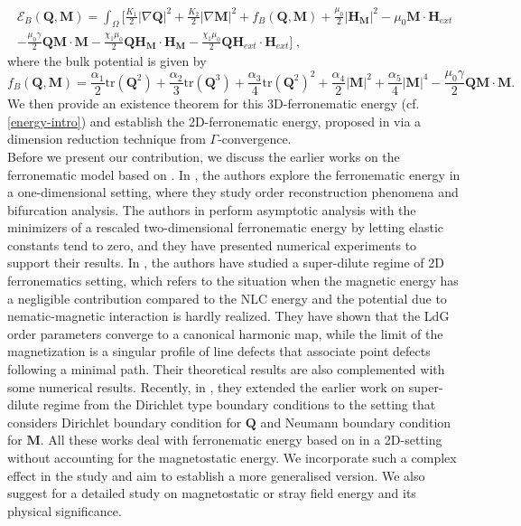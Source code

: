 \documentclass{article}
\def\Qvec{\mathbf{Q}}
\def \Mvec{\mathbf{M}}
\def\Hvec{\mathbf{H}}
\begin{document}
\begin{eqnarray}\label{energy-intro}
\mathcal{E}_B\left(\Qvec, \Mvec\right) = \int_{\Omega} \biggl[\frac{K_1}{2}|\nabla \Qvec|^2 + \frac{K_2}{2}|\nabla \Mvec|^2 + f_B\left(\Qvec, \Mvec\right) + \frac{\mu_0}{2}|\Hvec_{\Mvec}|^2 - \mu_0\Mvec\cdot \Hvec_{ext}\nonumber\\
- \frac{\mu_0\gamma}{2}\Qvec\Mvec\cdot\Mvec - \frac{\chi_1\mu_0}{2}\Qvec\Hvec_{\Mvec}\cdot\Hvec_{\Mvec} - \frac{\chi_1\mu_0}{2}\Qvec\Hvec_{ext}\cdot\Hvec_{ext}\biggr]\;,
\end{eqnarray}
where the bulk potential is given by
\begin{displaymath}
f_B\left(\Qvec, \Mvec\right) = \frac{\alpha_1}{2}\mbox{tr}(\Qvec^2) + \frac{\alpha_2}{3}\mbox{tr}(\Qvec^3) + \frac{\alpha_3}{4}\mbox{tr}(\Qvec^2)^2 + \frac{\alpha_4}{2}|\Mvec|^2 + \frac{\alpha_5}{4}|\Mvec|^4 - \frac{\mu_0\gamma}{2}\Qvec\Mvec\cdot\Mvec.
\end{displaymath}
We then provide an existence theorem for this 3D-ferronematic energy (cf. \eqref{energy-intro}) and establish the 2D-ferronematic energy, proposed in \cite{dutta2025study} via a dimension reduction technique from $\Gamma$-convergence.\newline\\
Before we present our contribution, we discuss the earlier works on the ferronematic model based on \cite{Bisht2020}. In \cite{Dalby}, the authors explore the ferronematic energy in a one-dimensional setting, where they study order reconstruction phenomena and bifurcation analysis. The authors in \cite{maity2021parameter} perform asymptotic analysis with the minimizers of a rescaled two-dimensional ferronematic energy by letting elastic constants tend to zero, and they have presented numerical experiments to support their results. In \cite{Canevari}, the authors have studied a super-dilute regime of 2D ferronematics setting, which refers to the situation when the magnetic energy has a negligible contribution compared to the NLC energy and the potential due to nematic-magnetic interaction is hardly realized. They have shown that the LdG order parameters converge to a canonical harmonic map, while the limit of the magnetization is a singular profile of line defects that associate point defects following a minimal path. Their theoretical results are also complemented with some numerical results. Recently, in \cite{canevari2025formation}, they extended the earlier work on super-dilute regime from the Dirichlet type boundary conditions to the setting that considers Dirichlet boundary condition for $\Qvec$ and Neumann boundary condition for $\Mvec$. All these works deal with ferronematic energy based on \cite{Bisht2020} in a 2D-setting without accounting for the magnetostatic energy. We incorporate such a complex effect in the study and aim to establish a more generalised version. We also suggest \cite{hubert2008magnetic} for a detailed study on magnetostatic or stray field energy and its physical significance.\newline\\
\end{document}
